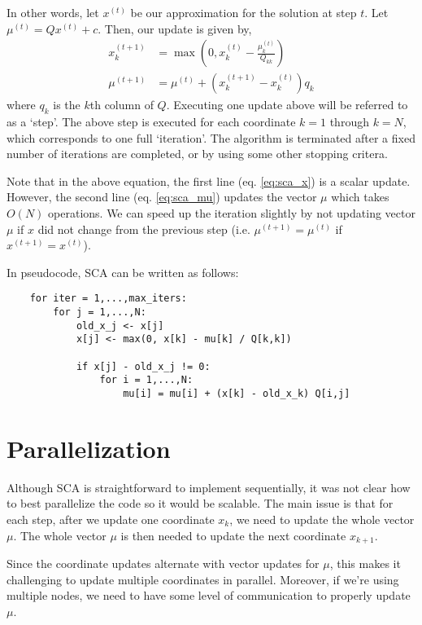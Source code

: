 \documentclass{article}
\begin{document}
In other words, let $x^{(t)}$ be our approximation for the solution at step $t$. Let $\mu^{(t)} = Q x^{(t)} + c$. Then, our update is given by,
\begin{align}
    x_k^{(t+1)} &= \max\left( 0, x_k^{(t)} - \frac{ \mu_k^{(t)}}{Q_{kk}} \right)\label{eq:sca_x}\\
    \mu^{(t+1)} &= \mu^{(t)} + ( x_k^{(t+1)} - x_k^{(t)} ) q_k\label{eq:sca_mu}
\end{align}
where $q_k$ is the $k$th column of $Q$. Executing one update above will be referred to as a `step'. The above step is executed for each coordinate $k = 1$ through $k = N$, which corresponds to one full `iteration'. The algorithm is terminated after a fixed number of iterations are completed, or by using some other stopping critera.

Note that in the above equation, the first line (eq. \ref{eq:sca_x}) is a scalar update. However, the second line (eq. \ref{eq:sca_mu}) updates the vector $\mu$ which takes $O(N)$ operations. We can speed up the iteration slightly by not updating vector $\mu$ if $x$ did not change from the previous step (i.e. $\mu^{(t+1)} = \mu^{(t)}$ if $x^{(t+1)} = x^{(t)}$).

In pseudocode, SCA can be written as follows:
\begin{verbatim}
    for iter = 1,...,max_iters:
        for j = 1,...,N:
            old_x_j <- x[j]
            x[j] <- max(0, x[k] - mu[k] / Q[k,k])
            
            if x[j] - old_x_j != 0:
                for i = 1,...,N:
                    mu[i] = mu[i] + (x[k] - old_x_k) Q[i,j]
\end{verbatim}

\section*{Parallelization}
Although SCA is straightforward to implement sequentially, it was not clear how to best parallelize the code so it would be scalable. The main issue is that for each step, after we update one coordinate $x_k$, we need to update the whole vector $\mu$. The whole vector $\mu$ is then needed to update the next coordinate $x_{k+1}$. 

Since the coordinate updates alternate with vector updates for $\mu$, this makes it challenging to update multiple coordinates in parallel. Moreover, if we're using multiple nodes, we need to have some level of communication to properly update $\mu$.
\end{document}
